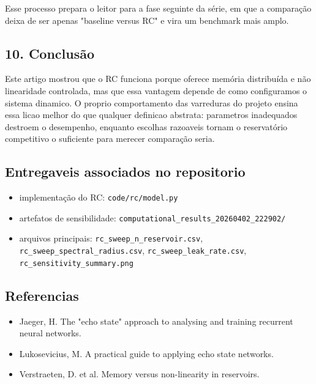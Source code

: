 \documentclass[12pt]{article}
\providecommand{\tightlist}{%
          \setlength{\itemsep}{0pt}\setlength{\parskip}{0pt}}
\begin{document}
Esse processo prepara o leitor para a fase seguinte da série, em que a comparação deixa de ser apenas "baseline versus RC" e vira um benchmark mais amplo.

\subsection{10. Conclusão}\label{10-conclusuxe3o}

Este artigo mostrou que o RC funciona porque oferece memória distribuída e não linearidade controlada, mas que essa vantagem depende de como configuramos o sistema dinamico. O proprio comportamento das varreduras do projeto ensina essa licao melhor do que qualquer definicao abstrata: parametros inadequados destroem o desempenho, enquanto escolhas razoaveis tornam o reservatório competitivo o suficiente para merecer comparação seria.

\subsection{Entregaveis associados no repositorio}\label{entregaveis-associados-no-repositorio}

\begin{itemize}
\tightlist
\item
  implementação do RC: \texttt{code/rc/model.py}
\item
  artefatos de sensibilidade: \texttt{computational\_results\_20260402\_222902/}
\item
  arquivos principais: \texttt{rc\_sweep\_n\_reservoir.csv}, \texttt{rc\_sweep\_spectral\_radius.csv}, \texttt{rc\_sweep\_leak\_rate.csv}, \texttt{rc\_sensitivity\_summary.png}
\end{itemize}

\subsection{Referencias}\label{referencias}

\begin{itemize}
\tightlist
\item
  Jaeger, H. The "echo state" approach to analysing and training recurrent neural networks.
\item
  Lukosevicius, M. A practical guide to applying echo state networks.
\item
  Verstraeten, D. et al. Memory versus non-linearity in reservoirs.
\end{itemize}

        
\end{document}
